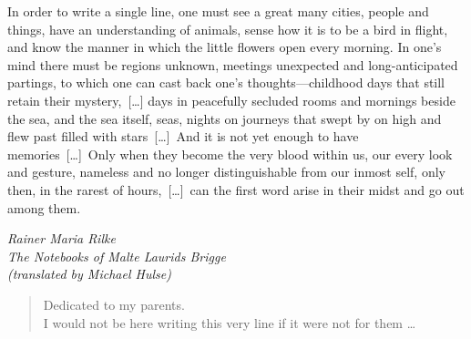
\begin{dedication} 
\setlength{\epigraphwidth}{0.63\textwidth}

\vspace*{-.25\paperheight}  
\epigraph{%
	In order to write a single line, one must see a great many cities, people and things, have an understanding of animals, sense how it is to be a bird in flight, and know the manner in which the little flowers open every morning. In one's mind there must be regions unknown, meetings unexpected and long-anticipated partings, to which one can cast back one's thoughts---childhood days that still retain their mystery,~[\dots] days in peacefully secluded rooms and mornings beside the sea, and the sea itself, seas, nights on journeys that swept by on high and flew past filled with stars~[\dots]~And it is not yet enough to have memories~[\dots]~Only when they become the very blood within us, our every look and gesture, nameless and no longer distinguishable from our inmost self, only then, in the rarest of hours,~[\dots]~can the first word arise in their midst and go out among them.}{\textit{Rainer Maria Rilke\\ The Notebooks of Malte Laurids Brigge~\\(translated by Michael Hulse)}}


\begin{quote} 
	\centering \vspace{2cm}
	\Large{Dedicated to my parents.}\\
	I would not be here writing this very line if it were not for them \ldots 
\end{quote}



\end{dedication}
